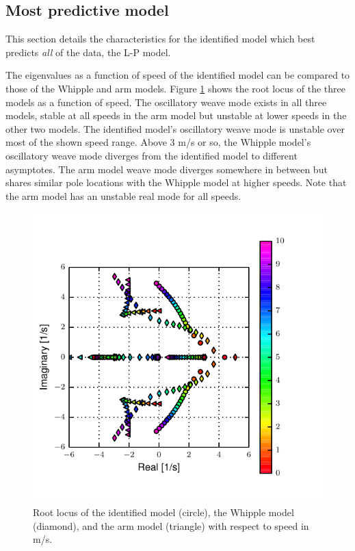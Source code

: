 \documentclass[a4paper]{article}
\begin{document}
\subsection{Most predictive model}
This section details the characteristics for the identified model which best
predicts \emph{all} of the data, the L-P model.

The eigenvalues as a function of speed of the identified model can be compared
to those of the Whipple and arm models. Figure \ref{fig:L-P-rlocus} shows the
root locus of the three models as a function of speed. The oscillatory weave
mode exists in all three models, stable at all speeds in the arm model but
unstable at lower speeds in the other two models. The identified model's
oscillatory weave mode is unstable over most of the shown speed range. Above 3
m/s or so, the Whipple model's oscillatory weave mode diverges from the
identified model to different asymptotes. The arm model weave mode diverges
somewhere in between but shares similar pole locations with the Whipple model
at higher speeds. Note that the arm model has an unstable real mode for all
speeds.

\begin{figure}
  \label{fig:L-P-rlocus}
  \includegraphics[width=5in]{figures/L-P-rlocus.pdf}
  \caption{Root locus of the identified model (circle), the Whipple model
    (diamond), and the arm model (triangle) with respect to speed in m/s.
    }
\end{figure}
\end{document}
